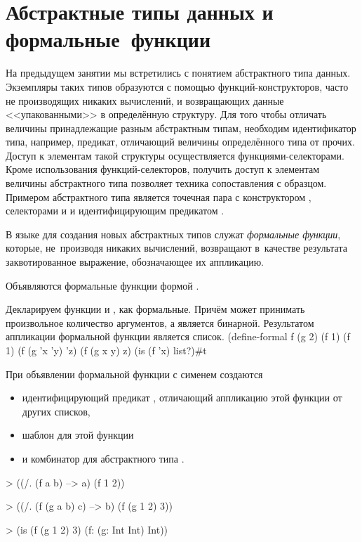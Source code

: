 
\section[4]{Абстрактные типы данных и формальные~функции}%
%
На предыдущем занятии мы встретились с понятием абстрактного типа данных. Экземпляры таких типов образуются с помощью функций-конструкторов, часто не производящих никаких вычислений, и возвращающих данные <<упакованными>> в определённую структуру. Для того чтобы отличать величины принадлежащие разным абстрактным типам, необходим идентификатор типа, например, предикат, отличающий величины определённого типа от прочих. Доступ к элементам такой структуры осуществляется функциями-селекторами. Кроме использования функций-селекторов, получить доступ к элементам величины абстрактного типа позволяет техника сопоставления с образцом. Примером абстрактного типа является точечная пара с конструктором , селекторами  и  и идентифицирующим предикатом .


В языке \Scheme для создания новых абстрактных типов служат \emph{формальные функции}, которые, не~производя никаких вычислений, возвращают в~качестве результата заквотированное выражение, обозначающее их аппликацию.

Объявляются формальные функции формой .

\begin{example}{%
Декларируем функции  и , как формальные. Причём  может принимать произвольное количество аргументов, а  является бинарной. Результатом аппликации формальной функции является список.}
\REPLin
  {(define-formal f (g 2)}
\REPL
  {(f 1)}
  {(f 1)}
\REPL
  {(f (g 'x 'y) 'z)}
  {(f (g x y) z)}
\REPL
  {(is (f 'x) list?)}{#t}
\end{example}

\begin{example}{%
При объявлении формальной функции с сименем  создаются
\begin{itemize}
\item идентифицирующий предикат , отличающий аппликацию этой функции от других списков, 
\item шаблон для этой функции  
\item и комбинатор для абстрактного типа .
\end{itemize}}
\smallskip
\begin{ExampleCode}
> ((/. (f a b) --> a) 
   (f 1 2))
\end{ExampleCode}
\smallskip
\begin{ExampleCode}
> ((/. (f (g a b) c) --> b) 
   (f (g 1 2) 3))
\end{ExampleCode}
\begin{ExampleCode}
> (is (f (g 1 2) 3)
      (f: (g: Int Int) Int))
\end{ExampleCode}
\end{example}

